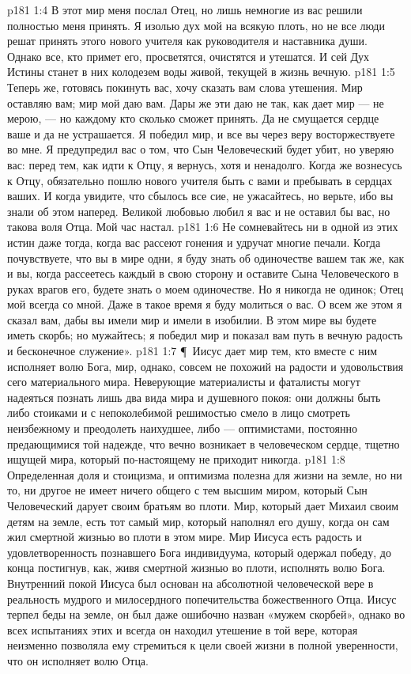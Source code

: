 \vs p181 1:4 В этот мир меня послал Отец, но лишь немногие из вас решили полностью меня принять. Я изолью дух мой на всякую плоть, но не все люди решат принять этого нового учителя как руководителя и наставника души. Однако все, кто примет его, просветятся, очистятся и утешатся. И сей Дух Истины станет в них колодезем воды живой, текущей в жизнь вечную.
\vs p181 1:5 Теперь же, готовясь покинуть вас, хочу сказать вам слова утешения. Мир оставляю вам; мир мой даю вам. Дары же эти даю не так, как дает мир --- не мерою, --- но каждому кто сколько сможет принять. Да не смущается сердце ваше и да не устрашается. Я победил мир, и все вы через веру восторжествуете во мне. Я предупредил вас о том, что Сын Человеческий будет убит, но уверяю вас: перед тем, как идти к Отцу, я вернусь, хотя и ненадолго. Когда же вознесусь к Отцу, обязательно пошлю нового учителя быть с вами и пребывать в сердцах ваших. И когда увидите, что сбылось все сие, не ужасайтесь, но верьте, ибо вы знали об этом наперед. Великой любовью любил я вас и не оставил бы вас, но такова воля Отца. Мой час настал.
\vs p181 1:6 Не сомневайтесь ни в одной из этих истин даже тогда, когда вас рассеют гонения и удручат многие печали. Когда почувствуете, что вы в мире одни, я буду знать об одиночестве вашем так же, как и вы, когда рассеетесь каждый в свою сторону и оставите Сына Человеческого в руках врагов его, будете знать о моем одиночестве. Но я никогда не одинок; Отец мой всегда со мной. Даже в такое время я буду молиться о вас. О всем же этом я сказал вам, дабы вы имели мир и имели в изобилии. В этом мире вы будете иметь скорбь; но мужайтесь; я победил мир и показал вам путь в вечную радость и бесконечное служение».
\vs p181 1:7 \P\ Иисус дает мир тем, кто вместе с ним исполняет волю Бога, мир, однако, совсем не похожий на радости и удовольствия сего материального мира. Неверующие материалисты и фаталисты могут надеяться познать лишь два вида мира и душевного покоя: они должны быть либо стоиками и с непоколебимой решимостью смело в лицо смотреть неизбежному и преодолеть наихудшее, либо --- оптимистами, постоянно предающимися той надежде, что вечно возникает в человеческом сердце, тщетно ищущей мира, который по\hyp{}настоящему не приходит никогда.
\vs p181 1:8 Определенная доля и стоицизма, и оптимизма полезна для жизни на земле, но ни то, ни другое не имеет ничего общего с тем высшим миром, который Сын Человеческий дарует своим братьям во плоти. Мир, который дает Михаил своим детям на земле, есть тот самый мир, который наполнял его душу, когда он сам жил смертной жизнью во плоти в этом мире. Мир Иисуса есть радость и удовлетворенность познавшего Бога индивидуума, который одержал победу, до конца постигнув, как, живя смертной жизнью во плоти, исполнять волю Бога. Внутренний покой Иисуса был основан на абсолютной человеческой вере в реальность мудрого и милосердного попечительства божественного Отца. Иисус терпел беды на земле, он был даже ошибочно назван «мужем скорбей», однако во всех испытаниях этих и всегда он находил утешение в той вере, которая неизменно позволяла ему стремиться к цели своей жизни в полной уверенности, что он исполняет волю Отца.
